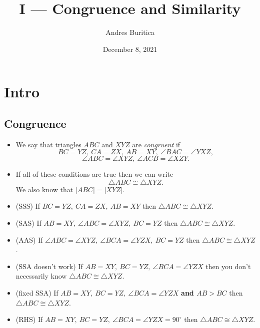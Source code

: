 \documentclass{article}
\title{I --- Congruence and Similarity}
\author{Andres Buritica}
\date{December 8, 2021}
\begin{document}
\maketitle
\section{Intro}
  \subsection{Congruence}
    \begin{itemize}
      \item We say that triangles $ABC$ and $XYZ$ are \emph{congruent} if $$BC=YZ,\ CA=ZX,\
      AB=XY,\ \angle BAC=\angle YXZ,$$
      $$\angle ABC=\angle XYZ,\ \angle ACB=\angle XZY.$$

    \item If all of these conditions are true then we can write $$\triangle
      ABC\cong\triangle XYZ.$$ We also know that $|ABC| = |XYZ|$.
      
    \item (SSS) If $BC=YZ,\ CA=ZX,\ AB=XY$ then $\triangle ABC\cong\triangle XYZ$.
    \item (SAS) If $AB=XY,\ \angle ABC=\angle XYZ,\ BC=YZ$ then $\triangle
      ABC\cong\triangle XYZ$.
    \item (AAS) If $\angle ABC=\angle XYZ,\ \angle BCA=\angle YZX,\ BC=YZ$ then $\triangle
      ABC\cong\triangle XYZ$.
    \item (SSA doesn't work) If $AB=XY,\ BC=YZ,\ \angle BCA=\angle YZX$ then you don't necessarily know
      $\triangle ABC\cong\triangle XYZ$.
    \item (fixed SSA) If $AB=XY,\ BC=YZ,\ \angle BCA=\angle YZX$ \textbf{and $AB>BC$} then
      $\triangle ABC\cong\triangle XYZ$.
    \item (RHS) If $AB=XY,\ BC=YZ,\ \angle BCA=\angle YZX=90^\circ$ then $\triangle
      ABC\cong\triangle XYZ$.
  \end{itemize}
\end{document}
